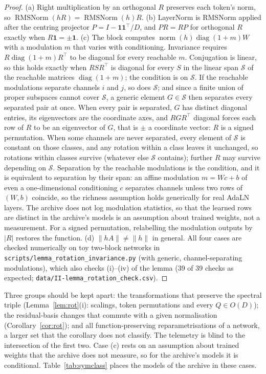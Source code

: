 \documentclass[11pt]{article}
\theoremstyle{definition}
\begin{document}
\begin{proof}
(a) Right multiplication by an orthogonal $R$ preserves each token's norm, so $\operatorname{RMSNorm}(hR)=\operatorname{RMSNorm}(h)R$. (b) LayerNorm is RMSNorm applied after the centring projector $P=I-\mathbf 1\mathbf 1^\top/D$, and $PR=RP$ for orthogonal $R$ exactly when $R\mathbf 1=\pm\mathbf 1$. (c) The block computes $\operatorname{norm}(h)\operatorname{diag}(1+m)W$ with a modulation $m$ that varies with conditioning. Invariance requires $R\operatorname{diag}(1+m)R^{\top}$ to be diagonal for every reachable $m$. Conjugation is linear, so this holds exactly when $RSR^\top$ is diagonal for every $S$ in the linear span $\mathcal S$ of the reachable matrices $\operatorname{diag}(1+m)$; the condition is on $\mathcal S$. If the reachable modulations separate channels $i$ and $j$, so does $\mathcal S$; and since a finite union of proper subspaces cannot cover $\mathcal S$, a generic element $G\in\mathcal S$ then separates every separated pair at once. When every pair is separated, $G$ has distinct diagonal entries, its eigenvectors are the coordinate axes, and $RGR^\top$ diagonal forces each row of $R$ to be an eigenvector of $G$, that is $\pm$ a coordinate vector: $R$ is a signed permutation. When some channels are never separated, every element of $\mathcal S$ is constant on those classes, and any rotation within a class leaves it unchanged, so rotations within classes survive (whatever else $\mathcal S$ contains); further $R$ may survive depending on $\mathcal S$. Separation by the reachable modulations is the condition, and it is equivalent to separation by their span: an affine modulation $m=Wc+b$ of even a one-dimensional conditioning $c$ separates channels unless two rows of $(W,b)$ coincide, so the richness assumption holds generically for real AdaLN layers. The archive does not log modulation statistics, so that the learned rows are distinct in the archive's models is an assumption about trained weights, not a measurement. For a signed permutation, relabelling the modulation outputs by $|R|$ restores the function. (d) $\|hA\|\neq\|h\|$ in general. All four cases are checked numerically on toy two-block networks in \texttt{scripts/lemma\_rotation\_invariance.py} (with generic, channel-separating modulations), which also checks (i)--(iv) of the lemma (39 of 39 checks as expected; \texttt{data/II-lemma\_rotation\_check.csv}).
\end{proof}
Three groups should be kept apart: the transformations that preserve the spectral triple (Lemma~\ref{lem:rot}(i): scalings, token permutations and every $Q\in O(D)$); the residual-basis changes that commute with a given normalisation (Corollary~\ref{cor:rot}); and all function-preserving reparametrisations of a network, a larger set that the corollary does not classify. The telemetry is blind to the intersection of the first two. Case (c) rests on an assumption about trained weights that the archive does not measure, so for the archive's models it is conditional. Table~\ref{tab:symclass} places the models of the archive in these cases.
\end{document}
